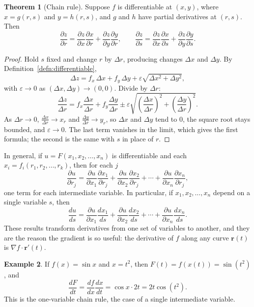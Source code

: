 \documentclass[11pt,a4paper]{article}
\theoremstyle{definition}
\newtheorem{thm}{Theorem}[subsection]
\newtheorem{exa}[thm]{Example}
\begin{document}
\begin{thm}[Chain rule]
\label{thm:chain}
Suppose $f$ is differentiable at $(x,y)$, where $x = g(r,s)$ and $y = h(r,s)$, and
$g$ and $h$ have partial derivatives at $(r,s)$. Then
\[\frac{\partial z}{\partial r} =\frac{\partial z}{\partial x}
\frac{\partial x}{\partial r} + \frac{\partial z}{\partial y}
\frac{\partial y}{\partial r},\qquad
\frac{\partial z}{\partial s} =\frac{\partial z}{\partial x}
\frac{\partial x}{\partial s} + \frac{\partial z}{\partial y}
\frac{\partial y}{\partial s}.\]
\end{thm}

\begin{proof}
Hold $s$ fixed and change $r$ by $\Delta r$, producing changes $\Delta x$ and
$\Delta y$. By Definition~\ref{defn:differentiable},
\[\Delta z = f_x\,\Delta x + f_y\,\Delta y + \varepsilon\sqrt{\Delta x^2 + \Delta
y^2},\]
with $\varepsilon\to 0$ as $(\Delta x,\Delta y)\to(0,0)$. Divide by $\Delta r$:
\[\frac{\Delta z}{\Delta r} = f_x\frac{\Delta x}{\Delta r} + f_y\frac{\Delta
y}{\Delta r} \pm \varepsilon\sqrt{\left(\frac{\Delta x}{\Delta r}\right)^2 +
\left(\frac{\Delta y}{\Delta r}\right)^2}.\]
As $\Delta r\to 0$, $\frac{\Delta x}{\Delta r}\to x_r$ and
$\frac{\Delta y}{\Delta r}\to y_r$, so $\Delta x$ and $\Delta y$ tend to $0$, the
square root stays bounded, and $\varepsilon\to 0$. The last term vanishes in the
limit, which gives the first formula; the second is the same with $s$ in place
of $r$.
\end{proof}

In general, if $u = F(x_1,x_2,\dots, x_n)$ is differentiable and each
$x_i = f_i (r_1,r_2,\dots, r_k)$, then for each $j$
\[\frac{\partial u}{\partial r_j}=\frac{\partial u}{\partial x_1}\frac{\partial
x_1}{\partial r_j}+ \frac{\partial u}{\partial x_2}\frac{\partial x_2}{\partial
r_j}+\cdots + \frac{\partial u}{\partial x_n}\frac{\partial x_n}{\partial r_j} ,\]
one term for each intermediate variable. In particular, if $x_1,x_2,\dots, x_n$
depend on a single variable $s$, then
\[\frac{du}{ds} = \frac{\partial u}{\partial x_1}\frac{dx_1}{ds}+ \frac{\partial
u}{\partial x_2}\frac{dx_2}{ds} +\cdots +\frac{\partial u}{\partial
x_n}\frac{dx_n}{ds}.\]
These results transform derivatives from one set of variables to another, and
they are the reason the gradient is so useful: the derivative of $f$ along any
curve $\mathbf r(t)$ is $\nabla f\cdot\mathbf r'(t)$.

\begin{exa}
\label{ex:chain1}
If $f(x) = \sin x$ and $x = t^2$, then $F(t) = f(x(t)) = \sin (t^2)$, and
\[\frac{dF}{d t} = \frac{d f}{dx} \frac{d x}{dt} = \cos x \cdot 2t =
2t\cos(t^2).\]
This is the one-variable chain rule, the case of a single intermediate variable.
\end{exa}
\end{document}
